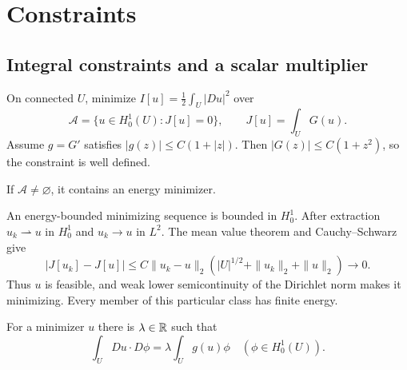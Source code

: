 \Needspace{55mm}
\section{Constraints}
\label{sec:8-4}
\Needspace{45mm}
\subsection{Integral constraints and a scalar multiplier}
On connected $U$, minimize $I[u]=\frac12\int_U|Du|^2$ over
\[
\mathcal A=\{u\in H^1_0(U):J[u]=0\},\qquad J[u]=\int_U G(u).
\]
Assume $g=G'$ satisfies $|g(z)|\leq C(1+|z|)$.
Then $|G(z)|\leq C(1+z^2)$, so the constraint is well defined.
\Needspace{55mm}
\begin{theorem}
If $\mathcal A\ne\varnothing$, it contains an energy minimizer.
\end{theorem}
\begin{expandedproof}
An energy-bounded minimizing sequence is bounded in $H^1_0$.
After extraction $u_k\rightharpoonup u$ in $H^1_0$ and $u_k\to u$ in $L^2$.
The mean value theorem and Cauchy--Schwarz give
\[
 |J[u_k]-J[u]|\leq C\|u_k-u\|_2
 (|U|^{1/2}+\|u_k\|_2+\|u\|_2)\longrightarrow0.
\]
Thus $u$ is feasible, and weak lower semicontinuity of the Dirichlet norm
makes it minimizing. Every member of this particular class has finite energy.
\end{expandedproof}
\Needspace{55mm}
\begin{theorem}
For a minimizer $u$ there is $\lambda\in\mathbb{R}$ such that
\begin{equation}\label{eq:8-multiplier}
 \int_U Du\cdot D\phi=\lambda\int_Ug(u)\phi
 \quad(\phi\in H^1_0(U)).
\end{equation}
\end{theorem}
